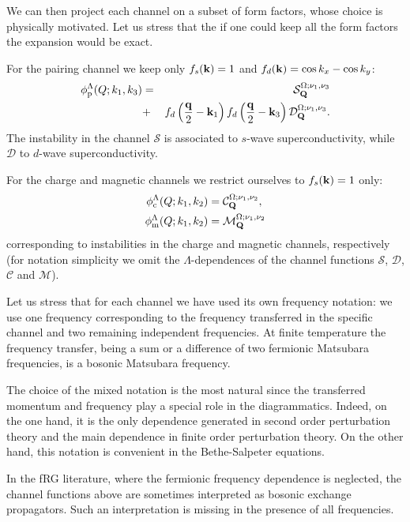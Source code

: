 We can then project each channel on a subset of form factors, whose choice is physically motivated\cite{Husemann2009}. 
Let us stress that the if one could keep all the  form factors the expansion would be exact.

For the pairing channel we keep only $f_{s}(\mathbf{k}) = 1$ and $f_d(\mathbf{k})=\cos{k_x} - \cos{k_y}$:
\begin{eqnarray}
\nonumber
  \phi^{\Lambda}_{\mathrm{p}}(Q;k_1,k_3) &=&
    \mathcal{S}_{\mathbf{Q}}^{\Omega;\nu_1,\nu_3}  \\ 
    &+& f_d\left(\frac{\mathbf{q}}{2}-\mathbf{k}_1\right) f_d\left(\frac{\mathbf{q}}{2}-\mathbf{k}_3\right) \mathcal{D}_{\mathbf{Q}}^{\Omega;\nu_1,\nu_3}.
\end{eqnarray}
The instability in the channel $\mathcal{S}$ is associated to $s$-wave superconductivity, while $\mathcal{D}$  to $d$-wave superconductivity.

For the charge and magnetic channels we restrict ourselves to $f_{s}(\mathbf{k})=1$ only:
\begin{align}
  \phi^\Lambda_{\mathrm{c}}(Q;k_1,k_2) &= \mathcal{C}_{\mathbf{Q}}^{\Omega;\nu_1,\nu_2}, \\
  \phi^\Lambda_{\mathrm{m}}(Q;k_1,k_2) &= \mathcal{M}_{\mathbf{Q}}^{\Omega;\nu_1,\nu_2}
\end{align}
corresponding to instabilities in the charge and magnetic channels, respectively (for notation simplicity we omit 
the $\Lambda$-dependences of the channel functions $\mathcal{S}$, $\mathcal{D}$, $\mathcal{C}$ and $\mathcal{M}$).

Let us stress that for each channel we have used its own frequency notation: we use one frequency corresponding to the frequency transferred in the specific channel 
and two remaining independent frequencies.  At finite temperature the frequency transfer, being a sum or a difference of 
two fermionic Matsubara frequencies, is a bosonic Matsubara frequency.

\noindent
The choice of the mixed notation is the most natural\cite{Wentzell2017} since the transferred momentum and 
frequency play a special role in the diagrammatics.
Indeed, on the one hand, it is the only dependence generated in second order perturbation theory and the main dependence in finite 
order perturbation theory. On the other hand, this notation is convenient in the Bethe-Salpeter equations\cite{Rohringer2012}.

In the fRG literature\cite{Husemann2009,Husemann2012,Giering2012}, where the fermionic frequency dependence is neglected, the channel functions above are sometimes interpreted as bosonic exchange propagators. Such an interpretation is missing in the presence of all frequencies.

